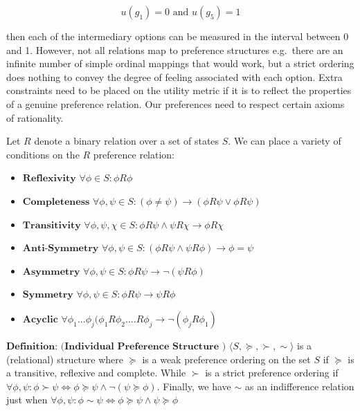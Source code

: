 \documentclass[]{tufte-book}
\theoremstyle{definition}
\theoremstyle{definition}
\theoremstyle{definition}
\theoremstyle{remark}
\begin{document}
\[ u(g_{1}) = 0 \text{ and } u(g_{5}) = 1 \]

then each of the intermediary options can be measured in the interval between 0 and 1. However, not all relations map to preference structures e.g.~there are an infinite number of simple ordinal mappings that would work, but a strict ordering does nothing to convey the degree of feeling associated with each option. Extra constraints need to be placed on the utility metric if it is to reflect the properties of a genuine preference relation. Our preferences need to respect certain axioms of rationality.

Let \(R\) denote a binary relation over a set of states \(S\).
We can place a variety of conditions on the \(R\) preference relation:

\begin{itemize}
\item
  \(\textbf{Reflexivity}\) \(\forall \phi \in S: \phi R \phi\)
\item
  \(\textbf{Completeness}\) \(\forall \phi, \psi \in S: (\phi \neq \psi) \rightarrow (\phi R \psi \vee \phi R \psi)\)
\item
  \(\textbf{Transitivity}\) \(\forall \phi, \psi, \chi \in S: \phi R \psi \wedge \psi R \chi \rightarrow \phi R \chi\)
\item
  \(\textbf{Anti-Symmetry}\) \(\forall \phi, \psi \in S: (\phi R \psi \wedge \psi R \phi) \rightarrow \phi = \psi\)
\item
  \(\textbf{Asymmetry}\) \(\forall \phi, \psi \in S: \phi R \psi \rightarrow \neg(\psi R \phi)\)
\item
  \(\textbf{Symmetry}\) \(\forall \phi, \psi \in S: \phi R \psi \rightarrow \psi R \phi\)
\item
  \(\textbf{Acyclic}\) \(\forall \phi_{1} ... \phi_{j} ( \phi_{1} R \phi_{2} .... R \phi_{j} \rightarrow \neg(\phi_{j} R \phi_{1})\)
\end{itemize}

\(\textbf{Definition: (Individual Preference Structure )}\) \(\langle S, \succeq, \succ, \sim \rangle\) is a (relational) structure where \(\succeq\) is a weak preference ordering on the set \(S\) if \(\succeq\) is a transitive, reflexive and complete. While \(\succ\) is a strict preference ordering if \({\forall \phi, \psi : \phi \succ \psi \Leftrightarrow \phi \succeq \psi \wedge \neg(\psi \succeq \phi)}\). Finally, we have \(\sim\) as an indifference relation just when \({ \forall \phi, \psi : \phi \sim \psi \Leftrightarrow \phi \succeq \psi \wedge \psi \succeq \phi}\)
\linebreak
\end{document}
